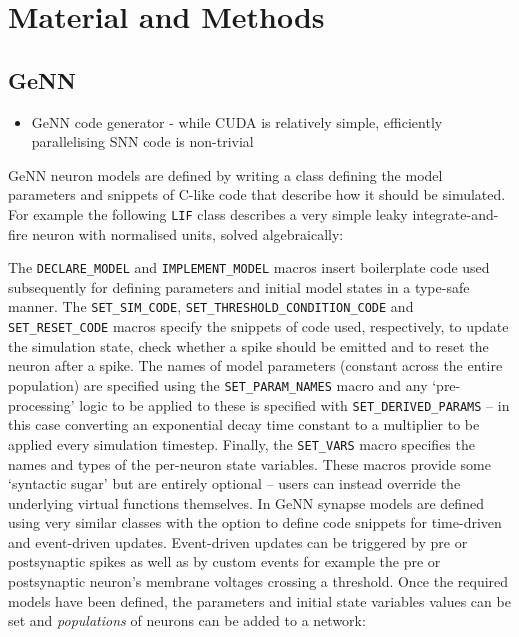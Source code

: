 \documentclass[utf8]{frontiersSCNS} %
\begin{document}
\section{Material and Methods}
\label{sec:method}
\subsection{GeNN}
\label{sec:method/genn}
\begin{itemize}
    \item GeNN code generator - while CUDA is relatively simple, efficiently parallelising SNN code is non-trivial    
\end{itemize}

GeNN neuron models are defined by writing a class defining the model parameters and snippets of C-like code that describe how it should be simulated.
For example the following \lstinline{LIF} class describes a very simple leaky integrate-and-fire neuron with normalised units, solved algebraically:



The \lstinline{DECLARE_MODEL} and \lstinline{IMPLEMENT_MODEL} macros insert boilerplate code used subsequently for defining parameters and initial model states in a type-safe manner.
The \lstinline{SET_SIM_CODE}, \lstinline{SET_THRESHOLD_CONDITION_CODE} and \lstinline{SET_RESET_CODE} macros specify the snippets of code used, respectively, to update the simulation state, check whether a spike should be emitted and to reset the neuron after a spike.
The names of model parameters (constant across the entire population) are specified using the \lstinline{SET_PARAM_NAMES} macro and any `pre-processing' logic to be applied to these is specified with \lstinline{SET_DERIVED_PARAMS} -- in this case converting an exponential decay time constant to a multiplier to be applied every simulation timestep.
Finally, the \lstinline{SET_VARS} macro specifies the names and types of the per-neuron state variables.
These macros provide some `syntactic sugar' but are entirely optional -- users can instead override the underlying virtual functions themselves.
In GeNN synapse models are defined using very similar classes with the option to define code snippets for time-driven and event-driven updates.
Event-driven updates can be triggered by pre or postsynaptic spikes as well as by custom events for example the pre or postsynaptic neuron's membrane voltages crossing a threshold.
Once the required models have been defined, the parameters and initial state variables values can be set and \textit{populations} of neurons can be added to a network:
%

\end{document}
